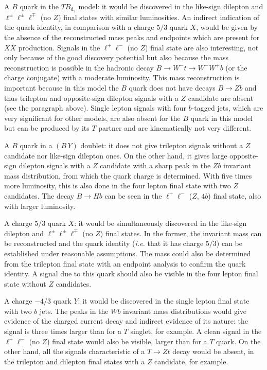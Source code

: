 \documentclass[12pt,a4paper]{article}
\newcommand{\XX}{X \bar X}
\newcommand{\TBD}{TB_{\text{d}_2}}
\newcommand{\BY}{(B \, Y)}
\begin{document}
A $B$ quark in the $\TBD$ model: it would be discovered in the like-sign dilepton and $\ell^\pm \ell^\pm \ell^\mp$ (no $Z$) final states with similar luminosities. An indirect indication of the quark identity, in comparison with a charge $5/3$ quark $X$, would be given by the absence of the reconstructed mass peaks and endpoints which are present for $\XX$ production. Signals in the $\ell^+ \ell^-$ (no $Z$) final state are also interesting, not only because of the good discovery potential but also because the mass reconstruction is possible in the hadronic decay $B \to W^- t \to W^- W^+ b$ (or the charge conjugate) with a moderate luminosity. This mass reconstruction is important because in this model the $B$ quark does not have decays $B \to Zb$ and thus trilepton and opposite-sign dilepton signals with a $Z$ candidate are absent (see the paragraph above). Single lepton signals with four $b$-tagged jets, which are very significant for other models, are also absent for the $B$ quark in this model but can be produced by its $T$ partner and are kinematically not very different.

A $B$ quark in a $\BY$ doublet: it does not give trilepton signals without a $Z$ candidate
nor like-sign dilepton ones. On the other hand, it gives large opposite-sign dilepton signals with a $Z$ candidate with a sharp peak in the $Zb$ invariant mass distribution, from which the quark charge is determined. With five times more luminosity, this is also done in the four lepton final state with two $Z$ candidates. The decay $B \to Hb$ can be seen in the $\ell^+ \ell^-$ ($Z$, $4b$) final state, also with larger luminosity.

A charge $5/3$ quark $X$: it would be simultaneously discovered in the like-sign dilepton and $\ell^\pm \ell^\pm \ell^\mp$ (no $Z$) final states. In the former, the invariant mass can be reconstructed and the quark identity ({\em i.e.} that it has charge $5/3$) can be established under reasonable assumptions. The mass could also be determined from the trilepton final state with an endpoint analysis to confirm the quark identity. A signal due to this quark should also be visible in the four lepton final state without $Z$ candidates.

A charge $-4/3$ quark $Y$: it would be discovered in the single lepton final state with two $b$ jets. The peaks in the $Wb$ invariant mass distributions would give evidence of the charged current decay and indirect evidence of its nature: the signal is three times larger than for a $T$ singlet, for example. A clean signal in the $\ell^+ \ell^-$ (no $Z$) final state would also be visible, larger than for a $T$ quark. On the other hand, all the signals characteristic of a $T \to Zt$ decay would be absent, in the trilepton and dilepton final states with a $Z$ candidate, for example.
\end{document}
